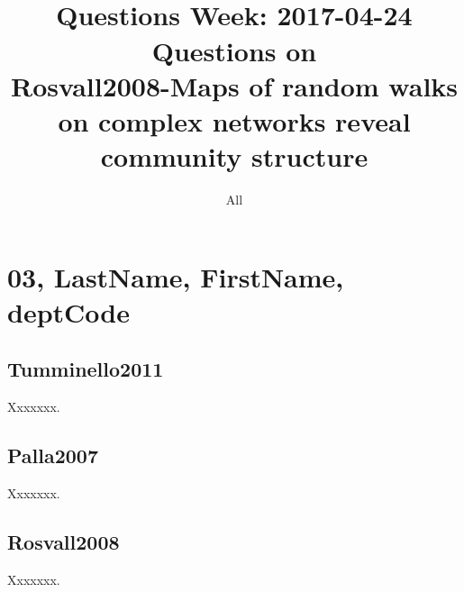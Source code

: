 \documentclass[11pt,a4,twocolumn]{article}
\title{
	{\small 	
		\hbCourse\\
		Questions Week: 2017-04-24\\ 
	}
	Questions on \\
	Rosvall2008-Maps of random walks on complex networks reveal community structure
}
\author{All}
\date{\hbTimeStamp}
\begin{document}
\maketitle
\setcounter{tocdepth}{1}
\tableofcontents



 
\section{03, LastName, FirstName, deptCode} 



 
\subsection{Tumminello2011}

Xxxxxxx.



 
\subsection{Palla2007}

Xxxxxxx.



 
\subsection{Rosvall2008}

Xxxxxxx.




\end{document}
